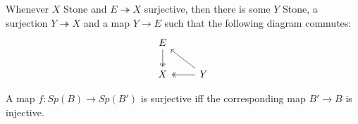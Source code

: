 \begin{axiom}
  Whenever $X$ Stone and $E\twoheadrightarrow X$ surjective, then there is some $Y$ Stone,
    a surjection $Y \twoheadrightarrow X$ and a map $Y\to E$ such that the following diagram commutes:
    \begin{equation}\begin{tikzcd}
      E \arrow[d,""',two heads]\\
      X & \arrow[l, "", two heads] Y\arrow[lu, ""']
    \end{tikzcd}\end{equation}  
\end{axiom} 

\begin{axiom}
  A map $f:Sp(B)\to Sp(B')$ is surjective iff the corresponding map $B' \to B$ is injective.
\end{axiom} 

